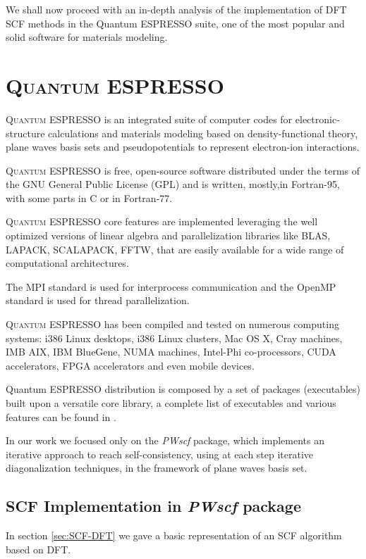 \documentclass[a4paper,12pt]{article}
\newcommand\QE{\textsc{Quantum} ESPRESSO }
\begin{document}
We shall now proceed with an in-depth analysis of the implementation of DFT SCF methods in the Quantum ESPRESSO suite, one of the most popular and solid software for materials modeling.


\newpage

\section{\QE}\label{sec:QE}

\QE  is an integrated suite of computer codes for electronic-structure calculations and materials modeling based on density-functional theory, plane waves basis sets and pseudopotentials to represent electron-ion interactions.

\QE is free, open-source software distributed under the terms of the GNU General Public License (GPL) and is written, mostly,in Fortran-95, with some parts in C or in Fortran-77.

\QE core features are implemented leveraging the well optimized versions of linear algebra and parallelization libraries like BLAS, LAPACK, SCALAPACK, FFTW, that are easily available for a wide range of computational architectures.

The MPI standard\cite{MPI} is used for interprocess communication and the OpenMP standard\cite{OMP} is used for thread parallelization.


\QE has been compiled and tested on numerous computing systems\cite{QEManual}: i386 Linux desktops, i386 Linux clusters, Mac OS X, Cray machines, IMB AIX, IBM BlueGene, NUMA machines, Intel-Phi co-processors, CUDA accelerators, FPGA accelerators and even mobile devices. 

Quantum ESPRESSO distribution is composed by a set of packages (executables) built upon a versatile core library, a complete list of executables and various features can be found in \cite{QE}.

In our work we focused only on the \textit{PWscf} package, which implements an iterative approach to reach self-consistency, using at each step iterative diagonalization techniques, in the framework of plane waves basis set.


\subsection{SCF Implementation in \textit{PWscf} package}
In section \ref{sec:SCF-DFT} we gave a basic representation of an SCF algorithm based on DFT.
\end{document}
